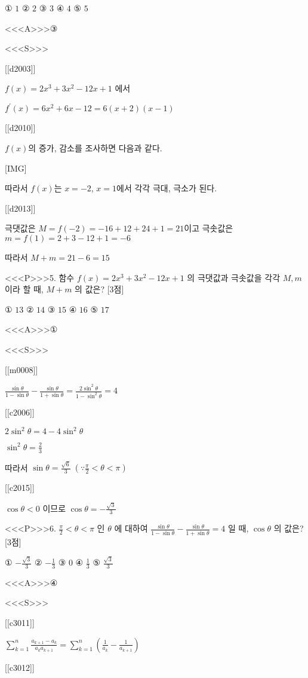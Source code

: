 \documentclass{oblivoir}
\begin{document}
① $1$
② $2$
③ $3$
④ $4$
⑤ $5$


<<<A>>>③

<<<S>>>

[[d2003]]

$f(x)=2 x^{3}+3 x^{2}-12 x+1$ 에서

$f^{\prime}(x)=6 x^{2}+6 x-12=6(x+2)(x-1)$

[[d2010]]

$f(x)$의 증가, 감소를 조사하면 다음과 같다.

[IMG]

따라서 $f(x)$는 $x=-2$, $x=1$에서 각각 극대, 극소가 된다.

[[d2013]]

극댓값은 $M=f(-2)=-16+12+24+1=21$이고
극솟값은 $m=f(1)=2+3-12+1=-6$

따라서 $M+m=21-6=15$


<<<P>>>5. 함수 $f(x)=2 x^{3}+3 x^{2}-12 x+1$ 의 극댓값과 극솟값을 각각 $M, m$ 이라 할 때, $M+m$ 의 값은? [3점]

① $13$
② $14$
③ $15$
④ $16$
⑤ $17$

<<<A>>>①

<<<S>>>

[[m0008]]

$ \frac{\sin \theta}{1-\sin \theta}-\frac{\sin \theta}{1+\sin \theta}=\frac{2 \sin ^{2} \theta}{1-\sin ^{2} \theta}=4$

[[c2006]]

$2 \sin ^{2} \theta=4-4 \sin ^{2} \theta$

$\sin ^{2} \theta=\frac{2}{3}$

따라서 $\sin \theta=\frac{\sqrt{6}}{3}\;\left(\because \frac{\pi}{2}<\theta<\pi\right)$

[[c2015]]

$\cos \theta<0$ 이므로 $\cos \theta=-\frac{\sqrt{3}}{3}$


<<<P>>>6. $\frac{\pi}{2}<\theta<\pi$ 인 $\theta$ 에 대하여 $\frac{\sin \theta}{1-\sin \theta}-\frac{\sin \theta}{1+\sin \theta}=4$ 일 때, $\cos \theta$ 의 값은? [3점]

① $-\frac{\sqrt{3}}{3}$
② $-\frac{1}{3}$
③ $0$
④ $\frac{1}{3}$
⑤ $\frac{\sqrt{3}}{3}$

<<<A>>>④

<<<S>>>

[[c3011]]

$ \sum_{k=1}^{n} \frac{a_{k+1}-a_{k}}{a_{k} a_{k+1}} =\sum_{k=1}^{n}\left(\frac{1}{a_{k}}-\frac{1}{a_{k+1}}\right)$

[[c3012]]
\end{document}
